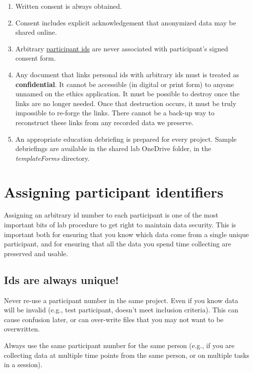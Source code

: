 \documentclass[
  12pt,
]{book}
\begin{document}
\begin{enumerate}
\def\labelenumi{\arabic{enumi}.}
\item
  Written consent is always obtained.
\item
  Consent includes explicit acknowledgement that anonymized data may be shared online.
\item
  Arbitrary \hyperref[assigning-participant-identifiers]{participant ids} are never associated with participant's signed consent form.
\item
  Any document that links personal ids with arbitrary ids must is treated as \textbf{confidential}. It cannot be accessible (in digital or print form) to anyone unnamed on the ethics application. It must be possible to destroy once the links are no longer needed. Once that destruction occurs, it must be truly impossible to re-forge the links. There cannot be a back-up way to reconstruct these links from any recorded data we preserve.
\item
  An appropriate education debriefing is prepared for every project. Sample debriefings are available in the shared lab OneDrive folder, in the \emph{templateForms} directory.
\end{enumerate}

\section{Assigning participant identifiers}\label{assigning-participant-identifiers}

Assigning an arbitrary id number to each participant is one of the most important bits of lab procedure to get right to maintain data security. This is important both for ensuring that you know which data come from a single unique participant, and for ensuring that all the data you spend time collecting are preserved and usable.

\subsection{Ids are always unique!}\label{ids-are-always-unique}

Never re-use a participant number in the same project. Even if you know data will be invalid (e.g., test participant, doesn't meet inclusion criteria). This can cause confusion later, or can over-write files that you may not want to be overwritten.

Always use the same participant number for the same person (e.g., if you are collecting data at multiple time points from the same person, or on multiple tasks in a session).
\end{document}
